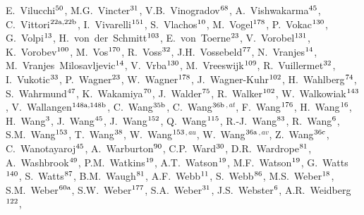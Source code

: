 \begin{flushleft}
E.~Vilucchi$^\textrm{\scriptsize 50}$,
M.G.~Vincter$^\textrm{\scriptsize 31}$,
V.B.~Vinogradov$^\textrm{\scriptsize 68}$,
A.~Vishwakarma$^\textrm{\scriptsize 45}$,
C.~Vittori$^\textrm{\scriptsize 22a,22b}$,
I.~Vivarelli$^\textrm{\scriptsize 151}$,
S.~Vlachos$^\textrm{\scriptsize 10}$,
M.~Vogel$^\textrm{\scriptsize 178}$,
P.~Vokac$^\textrm{\scriptsize 130}$,
G.~Volpi$^\textrm{\scriptsize 13}$,
H.~von~der~Schmitt$^\textrm{\scriptsize 103}$,
E.~von~Toerne$^\textrm{\scriptsize 23}$,
V.~Vorobel$^\textrm{\scriptsize 131}$,
K.~Vorobev$^\textrm{\scriptsize 100}$,
M.~Vos$^\textrm{\scriptsize 170}$,
R.~Voss$^\textrm{\scriptsize 32}$,
J.H.~Vossebeld$^\textrm{\scriptsize 77}$,
N.~Vranjes$^\textrm{\scriptsize 14}$,
M.~Vranjes~Milosavljevic$^\textrm{\scriptsize 14}$,
V.~Vrba$^\textrm{\scriptsize 130}$,
M.~Vreeswijk$^\textrm{\scriptsize 109}$,
R.~Vuillermet$^\textrm{\scriptsize 32}$,
I.~Vukotic$^\textrm{\scriptsize 33}$,
P.~Wagner$^\textrm{\scriptsize 23}$,
W.~Wagner$^\textrm{\scriptsize 178}$,
J.~Wagner-Kuhr$^\textrm{\scriptsize 102}$,
H.~Wahlberg$^\textrm{\scriptsize 74}$,
S.~Wahrmund$^\textrm{\scriptsize 47}$,
K.~Wakamiya$^\textrm{\scriptsize 70}$,
J.~Walder$^\textrm{\scriptsize 75}$,
R.~Walker$^\textrm{\scriptsize 102}$,
W.~Walkowiak$^\textrm{\scriptsize 143}$,
V.~Wallangen$^\textrm{\scriptsize 148a,148b}$,
C.~Wang$^\textrm{\scriptsize 35b}$,
C.~Wang$^\textrm{\scriptsize 36b}$$^{,at}$,
F.~Wang$^\textrm{\scriptsize 176}$,
H.~Wang$^\textrm{\scriptsize 16}$,
H.~Wang$^\textrm{\scriptsize 3}$,
J.~Wang$^\textrm{\scriptsize 45}$,
J.~Wang$^\textrm{\scriptsize 152}$,
Q.~Wang$^\textrm{\scriptsize 115}$,
R.-J.~Wang$^\textrm{\scriptsize 83}$,
R.~Wang$^\textrm{\scriptsize 6}$,
S.M.~Wang$^\textrm{\scriptsize 153}$,
T.~Wang$^\textrm{\scriptsize 38}$,
W.~Wang$^\textrm{\scriptsize 153}$$^{,au}$,
W.~Wang$^\textrm{\scriptsize 36a}$$^{,av}$,
Z.~Wang$^\textrm{\scriptsize 36c}$,
C.~Wanotayaroj$^\textrm{\scriptsize 45}$,
A.~Warburton$^\textrm{\scriptsize 90}$,
C.P.~Ward$^\textrm{\scriptsize 30}$,
D.R.~Wardrope$^\textrm{\scriptsize 81}$,
A.~Washbrook$^\textrm{\scriptsize 49}$,
P.M.~Watkins$^\textrm{\scriptsize 19}$,
A.T.~Watson$^\textrm{\scriptsize 19}$,
M.F.~Watson$^\textrm{\scriptsize 19}$,
G.~Watts$^\textrm{\scriptsize 140}$,
S.~Watts$^\textrm{\scriptsize 87}$,
B.M.~Waugh$^\textrm{\scriptsize 81}$,
A.F.~Webb$^\textrm{\scriptsize 11}$,
S.~Webb$^\textrm{\scriptsize 86}$,
M.S.~Weber$^\textrm{\scriptsize 18}$,
S.M.~Weber$^\textrm{\scriptsize 60a}$,
S.W.~Weber$^\textrm{\scriptsize 177}$,
S.A.~Weber$^\textrm{\scriptsize 31}$,
J.S.~Webster$^\textrm{\scriptsize 6}$,
A.R.~Weidberg$^\textrm{\scriptsize 122}$,
$$
\end{flushleft}
